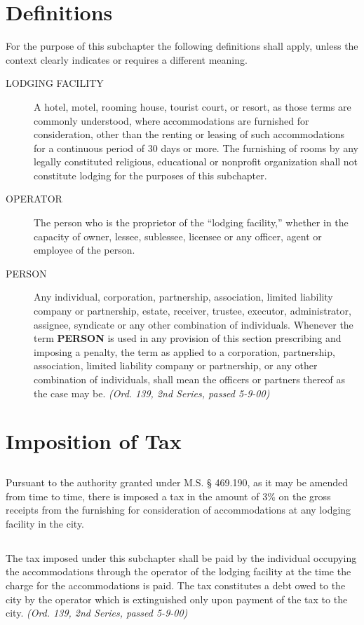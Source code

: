 \section{Definitions}
For the purpose of this subchapter the following definitions shall apply, unless the context clearly indicates or requires a different meaning.
\begin{description}
\item[LODGING FACILITY] A hotel, motel, rooming house, tourist court, or resort, as those terms are commonly understood, where accommodations are furnished for consideration, other than the renting or leasing of such accommodations for a continuous period of 30 days or more.  The furnishing of rooms by any legally constituted religious, educational or nonprofit organization shall not constitute lodging for the purposes of this subchapter.
\item[OPERATOR] The person who is the proprietor of the “lodging facility,” whether in the capacity of owner, lessee, sublessee, licensee or any officer, agent or employee of the person.
\item[PERSON] Any individual, corporation, partnership, association, limited liability company or partnership, estate, receiver, trustee, executor, administrator, assignee, syndicate or any other combination of individuals.  Whenever the term \textbf{PERSON} is used in any provision of this section prescribing and imposing a penalty, the term as applied to a corporation, partnership, association, limited liability company or partnership, or any other combination of individuals, shall mean the officers or partners thereof as the case may be.\newline
\emph{(Ord. 139, 2nd Series, passed 5-9-00)}
\end{description}
\section{Imposition of Tax}
\subsection{}
Pursuant to the authority granted under M.S. § 469.190, as it may be amended from time to time, there is imposed a tax in the amount of 3\% on the gross receipts from the furnishing for consideration of accommodations at any lodging facility in the city.
\subsection{}
The tax imposed under this subchapter shall be paid by the individual occupying the accommodations through the operator of the lodging facility at the time the charge for the accommodations is paid.  The tax constitutes a debt owed to the city by the operator which is extinguished only upon payment of the tax to the city.\newline
\emph{(Ord. 139, 2nd Series, passed 5-9-00)}
